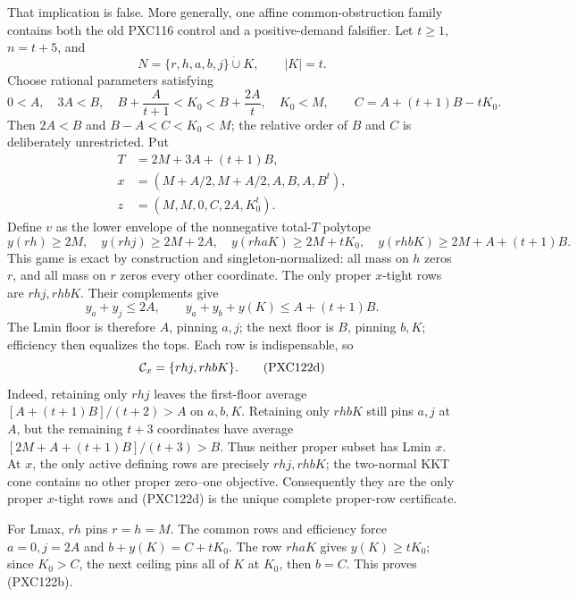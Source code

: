 \documentclass[11pt]{article}
\begin{document}
That implication is false.  More generally, one affine common-obstruction
family contains both the old PXC116 control and a positive-demand falsifier.
Let \(t\ge1\), \(n=t+5\), and
\[
 N=\{r,h,a,b,j\}\mathbin{\dot\cup}K,\qquad |K|=t.
\]
Choose rational parameters satisfying
\[
 0<A,\quad 3A<B,\quad
 B+\frac{A}{t+1}<K_0<B+\frac{2A}{t},\quad K_0<M,
 \qquad C=A+(t+1)B-tK_0.                            \tag{PXC122a}
\]
Then \(2A<B\) and \(B-A<C<K_0<M\); the relative order of \(B\) and
\(C\) is deliberately unrestricted.  Put
\begin{equation}
\begin{split}
T&=2M+3A+(t+1)B,\\
x&=(M+A/2,M+A/2,A,B,A,B^t),\\
z&=(M,M,0,C,2A,K_0^t).
\end{split}
\tag{PXC122b}
\end{equation}
Define \(v\) as the lower envelope of the nonnegative total-\(T\) polytope
\[
 y(rh)\ge2M,\quad y(rhj)\ge2M+2A,\quad
 y(rhaK)\ge2M+tK_0,\quad
 y(rhbK)\ge2M+A+(t+1)B.                             \tag{PXC122c}
\]
This game is exact by construction and singleton-normalized: all mass on
\(h\) zeros \(r\), and all mass on \(r\) zeros every other coordinate.
The only proper \(x\)-tight rows are \(rhj,rhbK\).  Their complements give
\[
 y_a+y_j\le2A,\qquad y_a+y_b+y(K)\le A+(t+1)B.
\]
The Lmin floor is therefore \(A\), pinning \(a,j\); the next floor is
\(B\), pinning \(b,K\); efficiency then equalizes the tops.  Each row is
indispensable, so
\[
                 {\cal C}_x=\{rhj,rhbK\}.            \tag{PXC122d}
\]
Indeed, retaining only \(rhj\) leaves the first-floor average
\([A+(t+1)B]/(t+2)>A\) on \(a,b,K\).  Retaining only \(rhbK\) still pins
\(a,j\) at \(A\), but the remaining \(t+3\) coordinates have average
\([2M+A+(t+1)B]/(t+3)>B\).  Thus neither proper subset has Lmin \(x\).
At \(x\), the only active defining rows are precisely \(rhj,rhbK\);
the two-normal KKT cone contains no other proper zero--one objective.
Consequently they are the only proper \(x\)-tight rows and (PXC122d) is
the unique complete proper-row certificate.

For Lmax, \(rh\) pins \(r=h=M\).  The common rows and efficiency force
\(a=0,j=2A\) and \(b+y(K)=C+tK_0\).  The row \(rhaK\) gives
\(y(K)\ge tK_0\); since \(K_0>C\), the next ceiling pins all of \(K\) at
\(K_0\), then \(b=C\).  This proves (PXC122b).
\end{document}

